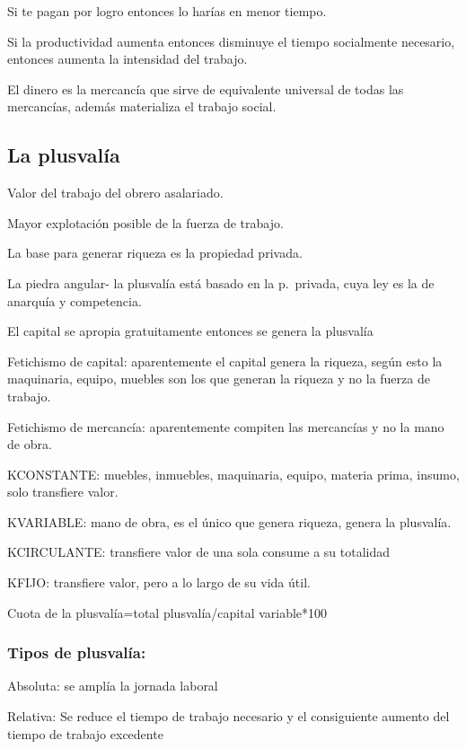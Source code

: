 \documentclass[
  a4paper,
]{article}
\begin{document}
Si te pagan por logro entonces lo harías en menor tiempo.

Si la productividad aumenta entonces disminuye el tiempo socialmente
necesario, entonces aumenta la intensidad del trabajo.

El dinero es la mercancía que sirve de equivalente universal de todas
las mercancías, además materializa el trabajo social.

\hypertarget{la-plusvaluxeda}{%
\subsection{La plusvalía}\label{la-plusvaluxeda}}

Valor del trabajo del obrero asalariado.

Mayor explotación posible de la fuerza de trabajo.

La base para generar riqueza es la propiedad privada.

La piedra angular- la plusvalía está basado en la p.~privada, cuya ley
es la de anarquía y competencia.

El capital se apropia gratuitamente entonces se genera la plusvalía

Fetichismo de capital: aparentemente el capital genera la riqueza, según
esto la maquinaria, equipo, muebles son los que generan la riqueza y no
la fuerza de trabajo.

Fetichismo de mercancía: aparentemente compiten las mercancías y no la
mano de obra.

KCONSTANTE: muebles, inmuebles, maquinaria, equipo, materia prima,
insumo, solo transfiere valor.

KVARIABLE: mano de obra, es el único que genera riqueza, genera la
plusvalía.

KCIRCULANTE: transfiere valor de una sola consume a su totalidad

KFIJO: transfiere valor, pero a lo largo de su vida útil.

Cuota de la plusvalía=total plusvalía/capital variable*100

\hypertarget{tipos-de-plusvaluxeda}{%
\subsubsection{Tipos de plusvalía:}\label{tipos-de-plusvaluxeda}}

Absoluta: se amplía la jornada laboral

Relativa: Se reduce el tiempo de trabajo necesario y el consiguiente
aumento del tiempo de trabajo excedente
\end{document}
